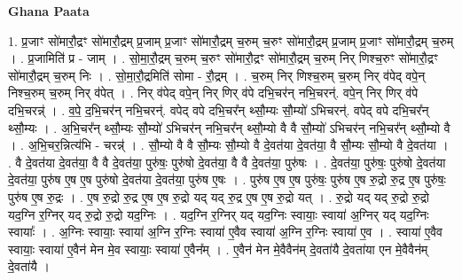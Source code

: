 \documentclass[17pt]{extarticle}
\begin{document}
\textbf{Ghana Paata } \newline

1. प्र॒जाꣳ सो॑मारौ॒द्रꣳ सो॑मारौ॒द्रम् प्र॒जाम् प्र॒जाꣳ सो॑मारौ॒द्रम् च॒रुम् च॒रुꣳ सो॑मारौ॒द्रम् प्र॒जाम् प्र॒जाꣳ सो॑मारौ॒द्रम् च॒रुम् । . प्र॒जामिति॑ प्र - जाम् । . सो॒मा॒रौ॒द्रम् च॒रुम् च॒रुꣳ सो॑मारौ॒द्रꣳ सो॑मारौ॒द्रम् च॒रुम् निर् णिश्च॒रुꣳ सो॑मारौ॒द्रꣳ सो॑मारौ॒द्रम् च॒रुम् निः । . सो॒मा॒रौ॒द्रमिति॑ सोमा - रौ॒द्रम् । . च॒रुम् निर् णिश्च॒रुम् च॒रुम् निर् व॑पेद् वपे॒न् निश्च॒रुम् च॒रुम् निर् व॑पेत् । . निर् व॑पेद् वपे॒न् निर् णिर् व॑पे दभि॒चर॑न् नभि॒चरन्॑. वपे॒न् निर् णिर् व॑पे दभि॒चरन्न्॑ । . व॒पे॒ द॒भि॒चर॑न् नभि॒चरन्॑. वपेद् वपे दभि॒चर᳚न् थ्सौ॒म्यः सौ॒म्यो॑ ऽभिचरन्॑. वपेद् वपे दभि॒चर᳚न् थ्सौ॒म्यः । . अ॒भि॒चर᳚न् थ्सौ॒म्यः सौ॒म्यो॑ ऽभिचर॑न् नभि॒चर᳚न् थ्सौ॒म्यो वै वै सौ॒म्यो॑ ऽभिचर॑न् नभि॒चर᳚न् थ्सौ॒म्यो वै । . अ॒भि॒चर॒न्नित्य॑भि - चरन्न्॑ । . सौ॒म्यो वै वै सौ॒म्यः सौ॒म्यो वै दे॒वत॑या दे॒वत॑या॒ वै सौ॒म्यः सौ॒म्यो वै दे॒वत॑या । . वै दे॒वत॑या दे॒वत॑या॒ वै वै दे॒वत॑या॒ पुरु॑षः॒ पुरु॑षो दे॒वत॑या॒ वै वै दे॒वत॑या॒ पुरु॑षः । . दे॒वत॑या॒ पुरु॑षः॒ पुरु॑षो दे॒वत॑या दे॒वत॑या॒ पुरु॑ष ए॒ष ए॒ष पुरु॑षो दे॒वत॑या दे॒वत॑या॒ पुरु॑ष ए॒षः । . पुरु॑ष ए॒ष ए॒ष पुरु॑षः॒ पुरु॑ष ए॒ष रु॒द्रो रु॒द्र ए॒ष पुरु॑षः॒ पुरु॑ष ए॒ष रु॒द्रः । . ए॒ष रु॒द्रो रु॒द्र ए॒ष ए॒ष रु॒द्रो यद् यद् रु॒द्र ए॒ष ए॒ष रु॒द्रो यत् । . रु॒द्रो यद् यद् रु॒द्रो रु॒द्रो यद॒ग्नि र॒ग्निर् यद् रु॒द्रो रु॒द्रो यद॒ग्निः । . यद॒ग्नि र॒ग्निर् यद् यद॒ग्निः स्वायाः॒ स्वाया॑ अ॒ग्निर् यद् यद॒ग्निः स्वायाः᳚ । . अ॒ग्निः स्वायाः॒ स्वाया॑ अ॒ग्नि र॒ग्निः स्वाया॑ ए॒वैव स्वाया॑ अ॒ग्नि र॒ग्निः स्वाया॑ ए॒व । . स्वाया॑ ए॒वैव स्वायाः॒ स्वाया॑ ए॒वैन॑ मेन मे॒व स्वायाः॒ स्वाया॑ ए॒वैन᳚म् । . ए॒वैन॑ मेन मे॒वैवैन॑म् दे॒वता॑यै दे॒वता॑या एन मे॒वैवैन॑म् दे॒वता॑यै । \newline
\end{document}
